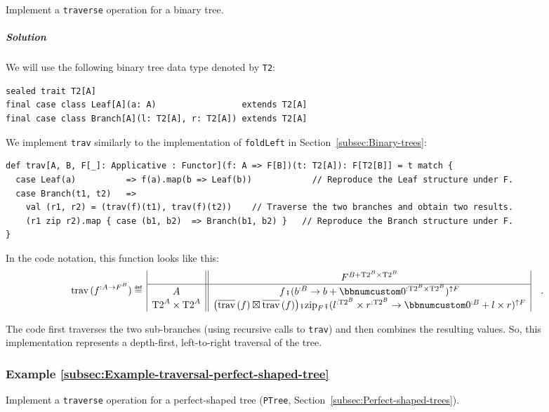 Implement a \lstinline!traverse! operation for a binary tree.

\subparagraph{Solution}

We will use the following binary tree data type denoted by \lstinline!T2!:
\begin{lstlisting}
sealed trait T2[A]
final case class Leaf[A](a: A)                 extends T2[A]
final case class Branch[A](l: T2[A], r: T2[A]) extends T2[A]
\end{lstlisting}
We implement \lstinline!trav! similarly to the implementation of
\lstinline!foldLeft! in Section~\ref{subsec:Binary-trees}:
\begin{lstlisting}
def trav[A, B, F[_]: Applicative : Functor](f: A => F[B])(t: T2[A]): F[T2[B]] = t match {
  case Leaf(a)          => f(a).map(b => Leaf(b))            // Reproduce the Leaf structure under F.
  case Branch(t1, t2)   =>
    val (r1, r2) = (trav(f)(t1), trav(f)(t2))    // Traverse the two branches and obtain two results.
    (r1 zip r2).map { case (b1, b2)  => Branch(b1, b2) }   // Reproduce the Branch structure under F.
}
\end{lstlisting}
In the code notation, this function looks like this:
\[
\text{trav}\,(f^{:A\rightarrow F^{B}})\triangleq\,\begin{array}{|c||c|}
 & F^{B+\text{T2}^{B}\times\text{T2}^{B}}\\
\hline A & f\bef(b^{:B}\rightarrow b+\bbnum 0^{:\text{T2}^{B}\times\text{T2}^{B}})^{\uparrow F}\\
\text{T2}^{A}\times\text{T2}^{A} & \big(\overline{\text{trav}}\,(f)\boxtimes\overline{\text{trav}}\,(f)\big)\bef\text{zip}_{F}\bef(l^{:\text{T2}^{B}}\times r^{:\text{T2}^{B}}\rightarrow\bbnum 0^{:B}+l\times r)^{\uparrow F}
\end{array}\quad.
\]

The code first traverses the two sub-branches (using recursive calls
to \lstinline!trav!) and then combines the resulting values. So,
this implementation represents a depth-first, left-to-right traversal
of the tree.

\subsubsection{Example \label{subsec:Example-traversal-perfect-shaped-tree}\ref{subsec:Example-traversal-perfect-shaped-tree}}

Implement a \lstinline!traverse! operation for a perfect-shaped tree
(\lstinline!PTree!, Section~\ref{subsec:Perfect-shaped-trees}).

